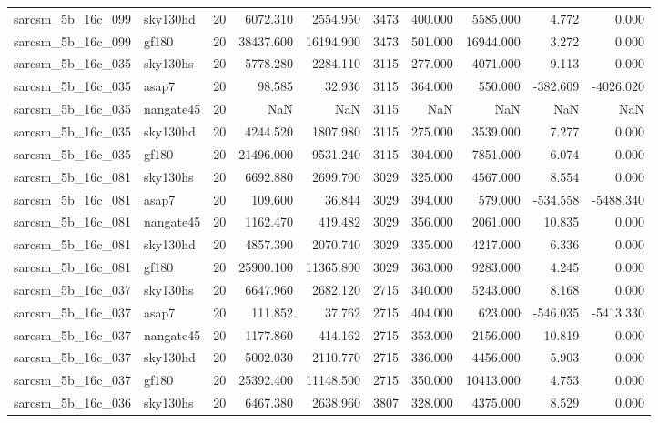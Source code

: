 \documentclass{article}
\begin{document}
\begin{longtable}{llrrrrrrrr}
sarcsm\_5b\_16c\_099 & sky130hd & 20 & 6072.310 & 2554.950 & 3473 & 400.000 & 5585.000 & 4.772 & 0.000 \\
sarcsm\_5b\_16c\_099 & gf180 & 20 & 38437.600 & 16194.900 & 3473 & 501.000 & 16944.000 & 3.272 & 0.000 \\
sarcsm\_5b\_16c\_035 & sky130hs & 20 & 5778.280 & 2284.110 & 3115 & 277.000 & 4071.000 & 9.113 & 0.000 \\
sarcsm\_5b\_16c\_035 & asap7 & 20 & 98.585 & 32.936 & 3115 & 364.000 & 550.000 & -382.609 & -4026.020 \\
sarcsm\_5b\_16c\_035 & nangate45 & 20 & NaN & NaN & 3115 & NaN & NaN & NaN & NaN \\
sarcsm\_5b\_16c\_035 & sky130hd & 20 & 4244.520 & 1807.980 & 3115 & 275.000 & 3539.000 & 7.277 & 0.000 \\
sarcsm\_5b\_16c\_035 & gf180 & 20 & 21496.000 & 9531.240 & 3115 & 304.000 & 7851.000 & 6.074 & 0.000 \\
sarcsm\_5b\_16c\_081 & sky130hs & 20 & 6692.880 & 2699.700 & 3029 & 325.000 & 4567.000 & 8.554 & 0.000 \\
sarcsm\_5b\_16c\_081 & asap7 & 20 & 109.600 & 36.844 & 3029 & 394.000 & 579.000 & -534.558 & -5488.340 \\
sarcsm\_5b\_16c\_081 & nangate45 & 20 & 1162.470 & 419.482 & 3029 & 356.000 & 2061.000 & 10.835 & 0.000 \\
sarcsm\_5b\_16c\_081 & sky130hd & 20 & 4857.390 & 2070.740 & 3029 & 335.000 & 4217.000 & 6.336 & 0.000 \\
sarcsm\_5b\_16c\_081 & gf180 & 20 & 25900.100 & 11365.800 & 3029 & 363.000 & 9283.000 & 4.245 & 0.000 \\
sarcsm\_5b\_16c\_037 & sky130hs & 20 & 6647.960 & 2682.120 & 2715 & 340.000 & 5243.000 & 8.168 & 0.000 \\
sarcsm\_5b\_16c\_037 & asap7 & 20 & 111.852 & 37.762 & 2715 & 404.000 & 623.000 & -546.035 & -5413.330 \\
sarcsm\_5b\_16c\_037 & nangate45 & 20 & 1177.860 & 414.162 & 2715 & 353.000 & 2156.000 & 10.819 & 0.000 \\
sarcsm\_5b\_16c\_037 & sky130hd & 20 & 5002.030 & 2110.770 & 2715 & 336.000 & 4456.000 & 5.903 & 0.000 \\
sarcsm\_5b\_16c\_037 & gf180 & 20 & 25392.400 & 11148.500 & 2715 & 350.000 & 10413.000 & 4.753 & 0.000 \\
sarcsm\_5b\_16c\_036 & sky130hs & 20 & 6467.380 & 2638.960 & 3807 & 328.000 & 4375.000 & 8.529 & 0.000 \\

\end{longtable}
\end{document}
